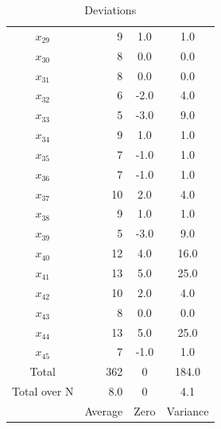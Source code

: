 \documentclass[nohyper,justified]{tufte-handout}\usepackage[]{graphicx}\usepackage[]{color}
\begin{document}
\begin{table}[ht]
\begin{tabular}{cr|c|c|}
  $x_{29}$ & 9 & 1.0 & 1.0 \\ 
   \rowcolor[gray]{0.95}$x_{30}$ & 8 & 0.0 & 0.0 \\ 
  $x_{31}$ & 8 & 0.0 & 0.0 \\ 
   \rowcolor[gray]{0.95}$x_{32}$ & 6 & -2.0 & 4.0 \\ 
  $x_{33}$ & 5 & -3.0 & 9.0 \\ 
   \rowcolor[gray]{0.95}$x_{34}$ & 9 & 1.0 & 1.0 \\ 
  $x_{35}$ & 7 & -1.0 & 1.0 \\ 
   \rowcolor[gray]{0.95}$x_{36}$ & 7 & -1.0 & 1.0 \\ 
  $x_{37}$ & 10 & 2.0 & 4.0 \\ 
   \rowcolor[gray]{0.95}$x_{38}$ & 9 & 1.0 & 1.0 \\ 
  $x_{39}$ & 5 & -3.0 & 9.0 \\ 
   \rowcolor[gray]{0.95}$x_{40}$ & 12 & 4.0 & 16.0 \\ 
  $x_{41}$ & 13 & 5.0 & 25.0 \\ 
   \rowcolor[gray]{0.95}$x_{42}$ & 10 & 2.0 & 4.0 \\ 
  $x_{43}$ & 8 & 0.0 & 0.0 \\ 
   \rowcolor[gray]{0.95}$x_{44}$ & 13 & 5.0 & 25.0 \\ 
  $x_{45}$ & 7 & -1.0 & 1.0 \\ 
   \bottomrule
Total & 362 & 0 & 184.0 \\ 
\rowcolor[gray]{0.95}Total over N &   8.0 & 0 &   4.1 \\ 
 & Average & Zero & Variance \\
\end{tabular}
\caption{Deviations} 
\end{table}


\begin{table}[ht]
\centering
{}
\caption{Frequency Table} 
\end{table}
\end{document}
